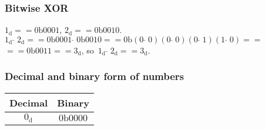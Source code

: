 \documentclass[10pt,t]{beamer}
\begin{document}
\begin{frame}
  \frametitle{Bitwise XOR}


  $1_{ \text{d} } == 0\text{b}0001$, $2_{ \text{d} } == 0\text{b}0010$. \\
  $1_{ \text{d} } \; \hat{} \; 2_{ \text{d} } == 0\text{b}0001 \; \hat{} \;
  0\text{b}0010 == 0\text{b}( 0 \; \hat{} \; 0 )( 0 \; \hat{} \; 0 )
  ( 0 \; \hat{} \; 1 )( 1 \; \hat{} \; 0 ) ==$ \\
  $== 0\text{b}0011 == 3_{ \text{d} }$,
  so~$1_{ \text{d} } \; \hat{} \; 2_{ \text{d} } == 3_{ \text{d} }$.

\end{frame}






















\begin{frame}
  \frametitle{Decimal and binary form of numbers}



  \begin{center}

    \begin{tabular}{|c|c|}
      \hline
      Decimal & Binary \\
      \hline
      $0_{ \text{d} }$ & $0\text{b}0000$ \\
      \hline
    \end{tabular}

  \end{center}

\end{frame}
\end{document}
